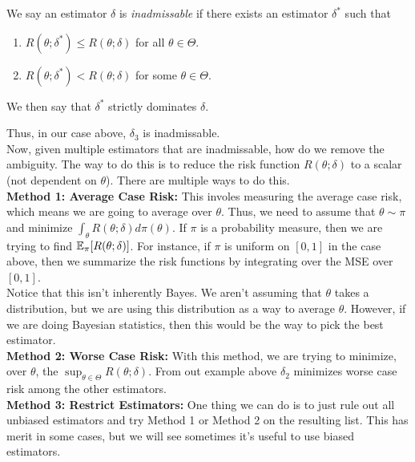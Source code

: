 \begin{definition}
    We say an estimator $\delta$ is \emph{inadmissable} if there exists an estimator $\delta^{*}$ such that
    \begin{enumerate}
        \item $R(\theta; \delta^{*}) \leq R(\theta; \delta)$ for all $\theta \in \Theta$.
        \item $R(\theta; \delta^{*}) < R(\theta; \delta)$ for some $\theta \in \Theta$. 
    \end{enumerate}
    We then say that $\delta^{*}$ strictly dominates $\delta$. 
\end{definition}

Thus, in our case above, $\delta_{3}$ is inadmissable.\\

Now, given multiple estimators that are inadmissable, how do we remove the ambiguity. The way to do this is to reduce the risk function $R(\theta; \delta)$ to a scalar (not dependent on $\theta$). There are multiple ways to do this.\\

\textbf{Method 1: Average Case Risk:} This involes measuring the average case risk, which means we are going to average over $\theta$. Thus, we need to assume that $\theta \sim \pi$ and minimize $\int_{\theta} R(\theta;\delta) d\pi(\theta)$. If $\pi$ is a probability measure, then we are trying to find $\mathbb{E}_{\pi}[R(\theta; \delta)]$. For instance, if $\pi$ is uniform on $[0, 1]$ in the case above, then we summarize the risk functions by integrating over the MSE over $[0, 1]$.\\

Notice that this isn't inherently Bayes. We aren't assuming that $\theta$ takes a distribution, but we are using this distribution as a way to average $\theta$. However, if we are doing Bayesian statistics, then this would be the way to pick the best estimator.\\

\textbf{Method 2: Worse Case Risk:} With this method, we are trying to minimize, over $\theta$, the $\sup_{\theta \in \Theta} R(\theta; \delta)$. From out example above $\delta_2$ minimizes worse case risk among the other estimators. \\

\textbf{Method 3: Restrict Estimators:} One thing we can do is to just rule out all unbiased estimators and try Method 1 or Method 2 on the resulting list. This has merit in some cases, but we will see sometimes it's useful to use biased estimators.

